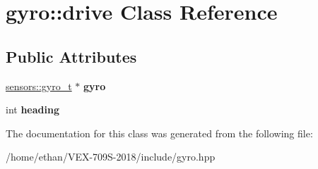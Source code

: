 \hypertarget{classgyro_1_1drive}{}\section{gyro\+:\+:drive Class Reference}
\label{classgyro_1_1drive}
\subsection*{Public Attributes}
\begin{DoxyCompactItemize}
\item 
\mbox{\label{classgyro_1_1drive_a5b4064dc01de0802b7f6d3036885091a}} 
\hyperlink{classsensors_1_1gyro__t}{sensors\+::gyro\+\_\+t} $\ast$ {\bfseries gyro}
\item 
\mbox{\label{classgyro_1_1drive_a76152598da7454dc162b95c1e8b6156e}} 
int {\bfseries heading}
\end{DoxyCompactItemize}


The documentation for this class was generated from the following file\+:\begin{DoxyCompactItemize}
\item 
/home/ethan/\+V\+E\+X-\/709\+S-\/2018/include/gyro.\+hpp\end{DoxyCompactItemize}
